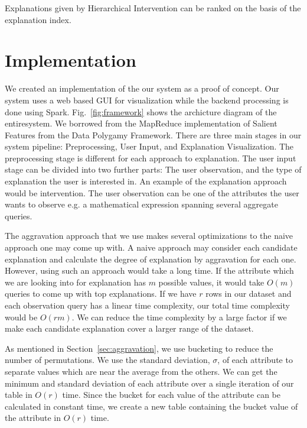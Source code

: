 Explanations given by Hierarchical Intervention can be ranked on the basis of the explanation index.


\section{Implementation}
\label{sec:implementation}
We created an implementation of the our system as a proof of concept. Our system uses a web based GUI for visualization while the backend processing is done using Spark\citep{shanahan2015large}. Fig.~\ref{fig:framework} shows the archicture diagram of the entiresystem. We borrowed from the MapReduce implementation of Salient Features from the Data Polygamy Framework\citep{chirigati2016data}. There are three main stages in our system pipeline: Preprocessing, User Input, and Explanation Visualization. The preprocessing stage is different for each approach to explanation. The user input stage can be divided into two further parts: The user observation, and the type of explanation the user is interested in. An example of the explanation approach would be intervention. The user observation can be one of the attributes the user wants to observe e.g. a mathematical expression spanning several aggregate queries.


\label{aggravation_impl}
The aggravation approach that we use makes several optimizations to the naive approach one may come up with. A naive approach may consider each candidate explanation and calculate the degree of explanation by aggravation for each one. However, using such an approach would take a long time. If the attribute which we are looking into for explanation has $m$ possible values, it would take $O(m)$ queries to come up with top explanations. If we have $r$ rows in our dataset and each observation query has a linear time complexity, our total time complexity would be $O(rm)$. We can reduce the time complexity by a large factor if we make each candidate explanation cover a larger range of the dataset.

As mentioned in Section~\ref{sec:aggravation}, we use bucketing to reduce the number of permutations. We use the standard deviation, $\sigma$, of each attribute to separate values which are near the average from the others. We can get the minimum and standard deviation of each attribute over a single iteration of our table in $O(r)$ time. Since the bucket for each value of the attribute can be calculated in constant time, we create a new table containing the bucket value of the attribute in $O(r)$ time.

